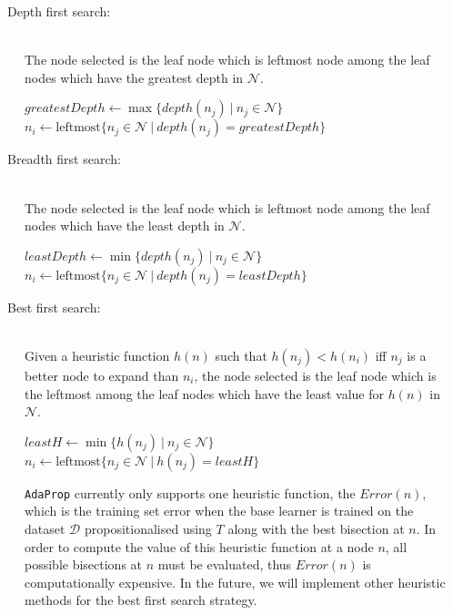 \documentclass[a4paper,12pt]{article} %
\newcommand{\AdaProp}{\texttt{AdaProp}\xspace}
\newcommand{\mcl}[1]{\mathcal{#1}}
\begin{document}
\begin{description}
\item[~~~Depth first search:] \ \\
    The node selected is the leaf node 
    which is leftmost node among 
    the leaf nodes which have the greatest depth
    in $\mcl{N}$.
\begin{algorithmic}
    \State $ greatestDepth \gets \max\{ depth(n_j) ~\big|~ n_j \in \mcl{N} \} $
    \State $ n_i \gets \textrm{leftmost}\{ n_j \in \mcl{N} ~\big|~ depth(n_j) = greatestDepth \} $
\end{algorithmic}
        
\item[~~~Breadth first search:] \ \\
    The node selected is the leaf node 
    which is leftmost node among 
    the leaf nodes which have the least depth
    in $\mcl{N}$.
\begin{algorithmic}
    \State $ leastDepth \gets \min\{ depth(n_j) ~\big|~ n_j \in \mcl{N} \} $
    \State $ n_i \gets \textrm{leftmost}\{ n_j \in \mcl{N} ~\big|~ depth(n_j) = leastDepth \} $
\end{algorithmic}
    
\item[~~~Best first search:] \ \\
    Given a heuristic function $h(n)$ such that
    $h(n_j) < h(n_i)$ iff $n_j$ is a better node to expand than $n_i$,
    the node selected is the leaf node 
    which is the leftmost among 
    the leaf nodes which have the least value for $h(n)$
    in $\mcl{N}$.
\begin{algorithmic}
    \State $ leastH \gets \min\{ h(n_j) ~\big|~ n_j \in \mcl{N} \} $
    \State $ n_i \gets \textrm{leftmost}\{ n_j \in \mcl{N} ~\big|~ h(n_j) = leastH \} $
\end{algorithmic}

    \AdaProp currently only supports one heuristic function, 
        the $Error(n)$, which is the training set error 
        when the base learner is trained on the dataset $\mcl{D}$
        propositionalised using $T$ along with 
        the best bisection at $n$.
     In order to compute the value of this heuristic function at a node $n$,
         all possible bisections at $n$ must be evaluated,
         thus $Error(n)$ is computationally expensive.
     In the future, we will implement other heuristic methods
         for the best first search strategy.
    
\end{description}
\end{document}
